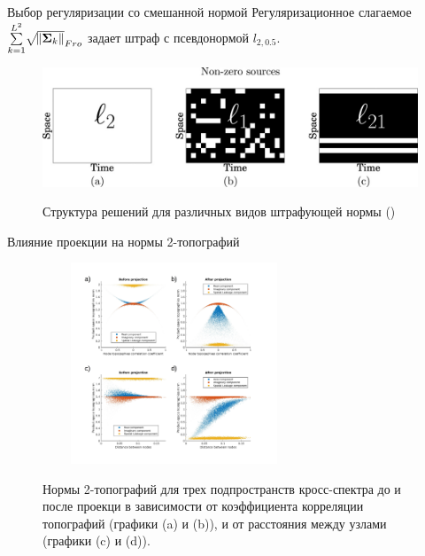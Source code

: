 \documentclass[12pt]{beamer}
\begin{document}
\begin{frame}{Выбор регуляризации со смешанной нормой}
 Регуляризационное слагаемое
 {${\sum\limits_{k=1}^{L^2}}\sqrt{\norm{\mathbf{\Sigma}_{k}}}_{Fro}$}
 задает штраф с псевдонормой $l_{2,0.5}$.
 \begin{figure}
 \centering
 \includegraphics[scale = 0.5]{Mixed-norm.jpg}

 {\footnotesize Структура решений для различных видов штрафующей нормы (\cite{Gramfort2012})}
 \label{fig:mix_n}
 \end{figure}
\end{frame}

\begin{frame}[t]{Влияние проекции на нормы 2-топографий}
    \begin{figure}[!ht]
     \centering
     \includegraphics[width=0.7\textwidth, height=6cm]{../images/psiicos_paper/Figure3abcd_hr}

     {\tiny Нормы 2-топографий для трех подпространств кросс-спектра до и после проекци
         в зависимости от коэффициента корреляции топографий (графики (a) и (b)), и от расстояния между узлами (графики (c) и (d)).}
    \end{figure}
\end{frame}
\end{document}
